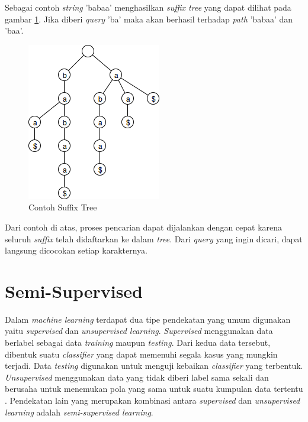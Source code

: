 Sebagai contoh \textit{string} 'babaa' menghasilkan \textit{suffix tree} yang dapat dilihat pada gambar \ref{fig:contoh-suffix-tree}. Jika diberi \textit{query} 'ba' maka akan berhasil terhadap \textit{path} 'babaa' dan 'baa'.
\begin{figure}
    \centering
    \includegraphics[scale=0.6]{pics/Contoh-SuffixTree}
    \caption{Contoh Suffix Tree}
    \label{fig:contoh-suffix-tree}
\end{figure}

\noindent Dari contoh di atas, proses pencarian dapat dijalankan dengan cepat karena seluruh \textit{suffix} telah didaftarkan ke dalam \textit{tree}. Dari \textit{query} yang ingin dicari, dapat langsung dicocokan setiap karakternya.

%
\section{Semi-Supervised}
Dalam \textit{machine learning} terdapat dua tipe pendekatan yang umum digunakan yaitu \textit{supervised} dan \textit{unsupervised learning}. \textit{Supervised} menggunakan data berlabel sebagai data \textit{training} maupun \textit{testing}. Dari kedua data tersebut, dibentuk suatu \textit{classifier} yang dapat memenuhi segala kasus yang mungkin terjadi. Data \textit{testing} digunakan untuk menguji kebaikan \textit{classifier} yang terbentuk. \textit{Unsupervised} menggunakan data yang tidak diberi label sama sekali dan berusaha untuk menemukan pola yang sama untuk suatu kumpulan data tertentu \citep{prakash2014survey}. Pendekatan lain yang merupakan kombinasi antara \textit{supervised} dan \textit{unsupervised learning} adalah \textit{semi-supervised learning}. 

